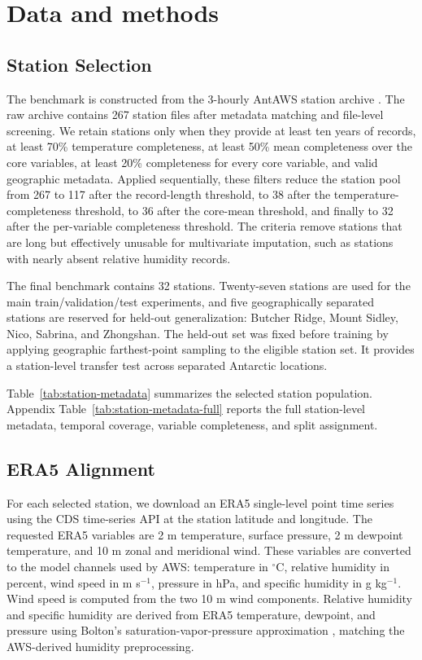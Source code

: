 \section{Data and methods}

\subsection{Station Selection}
The benchmark is constructed from the 3-hourly AntAWS station archive \citep{wang2023antaws}. The raw archive contains 267 station files after metadata matching and file-level screening. We retain stations only when they provide at least ten years of records, at least 70\% temperature completeness, at least 50\% mean completeness over the core variables, at least 20\% completeness for every core variable, and valid geographic metadata. Applied sequentially, these filters reduce the station pool from 267 to 117 after the record-length threshold, to 38 after the temperature-completeness threshold, to 36 after the core-mean threshold, and finally to 32 after the per-variable completeness threshold. The criteria remove stations that are long but effectively unusable for multivariate imputation, such as stations with nearly absent relative humidity records.

The final benchmark contains 32 stations. Twenty-seven stations are used for the main train/validation/test experiments, and five geographically separated stations are reserved for held-out generalization: Butcher Ridge, Mount Sidley, Nico, Sabrina, and Zhongshan. The held-out set was fixed before training by applying geographic farthest-point sampling to the eligible station set. It provides a station-level transfer test across separated Antarctic locations.

Table~\ref{tab:station-metadata} summarizes the selected station population. Appendix Table~\ref{tab:station-metadata-full} reports the full station-level metadata, temporal coverage, variable completeness, and split assignment.



\subsection{ERA5 Alignment}
For each selected station, we download an ERA5 single-level point time series \citep{hersbach2020era5} using the CDS time-series API at the station latitude and longitude. The requested ERA5 variables are 2 m temperature, surface pressure, 2 m dewpoint temperature, and 10 m zonal and meridional wind. These variables are converted to the model channels used by AWS: temperature in $^\circ$C, relative humidity in percent, wind speed in m s$^{-1}$, pressure in hPa, and specific humidity in g kg$^{-1}$. Wind speed is computed from the two 10 m wind components. Relative humidity and specific humidity are derived from ERA5 temperature, dewpoint, and pressure using Bolton's saturation-vapor-pressure approximation \citep{bolton1980computation}, matching the AWS-derived humidity preprocessing.

